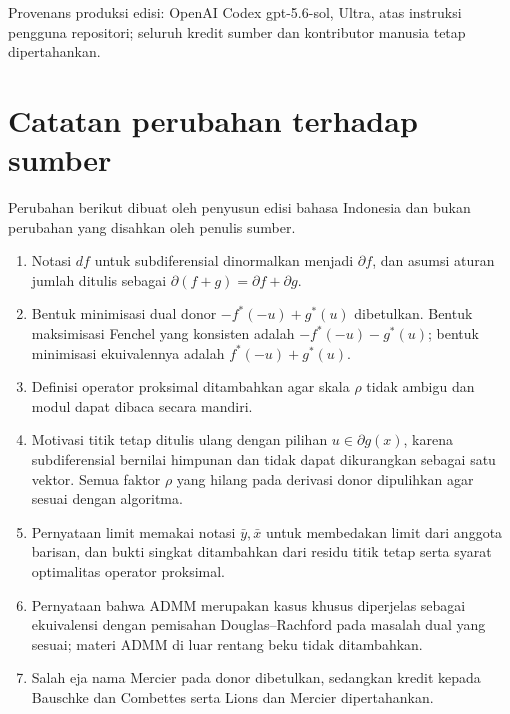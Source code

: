 \documentclass[indonesian]{shinybook}
\begin{document}
Provenans produksi edisi: OpenAI Codex gpt-5.6-sol, Ultra, atas instruksi
pengguna repositori;
seluruh kredit sumber dan kontributor manusia tetap dipertahankan.

\tableofcontents
\mainmatter


\backmatter
\chapter*{Catatan perubahan terhadap sumber}
Perubahan berikut dibuat oleh penyusun edisi bahasa Indonesia dan bukan
perubahan yang disahkan oleh penulis sumber.
\begingroup\small
\begin{enumerate}
  \setlength{\itemsep}{0.15em}
  \setlength{\parskip}{0pt}
  \item Notasi $d f$ untuk subdiferensial dinormalkan menjadi $\partial f$,
    dan asumsi aturan jumlah ditulis sebagai
    $\partial(f+g)=\partial f+\partial g$.
  \item Bentuk minimisasi dual donor
    $-f^*(-u)+g^*(u)$ dibetulkan. Bentuk maksimisasi Fenchel yang konsisten
    adalah $-f^*(-u)-g^*(u)$; bentuk minimisasi ekuivalennya adalah
    $f^*(-u)+g^*(u)$.
  \item Definisi operator proksimal ditambahkan agar skala $\rho$ tidak
    ambigu dan modul dapat dibaca secara mandiri.
  \item Motivasi titik tetap ditulis ulang dengan pilihan
    $u\in\partial g(x)$, karena subdiferensial bernilai himpunan dan tidak
    dapat dikurangkan sebagai satu vektor. Semua faktor $\rho$ yang hilang
    pada derivasi donor dipulihkan agar sesuai dengan algoritma.
  \item Pernyataan limit memakai notasi $\bar y,\bar x$ untuk membedakan limit
    dari anggota barisan, dan bukti singkat ditambahkan dari residu titik
    tetap serta syarat optimalitas operator proksimal.
  \item Pernyataan bahwa ADMM merupakan kasus khusus diperjelas sebagai
    ekuivalensi dengan pemisahan Douglas--Rachford pada masalah dual yang
    sesuai; materi ADMM di luar rentang beku tidak ditambahkan.
  \item Salah eja nama Mercier pada donor dibetulkan, sedangkan kredit kepada
    Bauschke dan Combettes serta Lions dan Mercier dipertahankan.
\end{enumerate}
\endgroup
\end{document}
